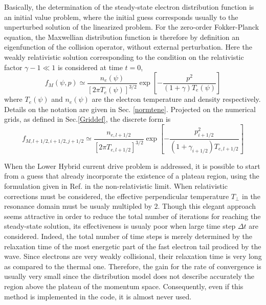

Basically, the determination of the steady-state electron distribution
function is an initial value problem, where the initial guess corresponds
usually to the unperturbed solution of the linearized problem. For the
zero-order Fokker-Planck equation, the Maxwellian distribution function is
therefore by definition an eigenfunction of the collision operator, without
external perturbation. Here the weakly relativistic solution corresponding
to the condition on the relativistic factor $\gamma -1\ll 1$ is considered
at time $t=0$,
\begin{equation}
f_{M}\left( \psi ,p\right) \simeq \frac{n_{e}\left( \psi \right) }{\left[ 2%
\pi T_{e}\left( \psi \right) \right] ^{3/2}}\exp \left[ -\frac{p^{2}}{\left(
1+\gamma \right) T_{e}\left( \psi \right) }\right]
\end{equation}
where $T_{e}\left( \psi \right) $ and $n_{e}\left( \psi \right) $ are the
electron temperature and density respectively. Details on the notation are
given in Sec. \ref{normtene}. Projected on the numerical grids, as defined
in Sec.\ref{Griddef}, the discrete form is
\begin{equation}
f_{M,l+1/2,i+1/2,j+1/2}\simeq \frac{n_{e,l+1/2}}{\left[ 2\pi %
T_{e,l+1/2}\right] ^{3/2}}\exp \left[ -\frac{p_{i+1/2}^{2}}{\left( 1+\gamma
_{i+1/2}\right) T_{e,l+1/2}}\right]
\end{equation}

When the Lower Hybrid current drive problem is addressed, it is possible to
start from a guess that already incorporate the existence of a plateau
region, using the formulation given in Ref. \cite{fuc85} in the
non-relativistic limit. When relativistic corrections must be considered,
the effective perpendicular temperature $T_{\bot }$ in the resonance domain
must be usualy  multipled by $2$. Though this elegant approach seems
attractive in order to reduce the total number of iterations for reaching
the steady-state solution, its effectiveness is usualy poor when large time
step $\Delta t$ are considered. Indeed, the total number of time steps is
merely determined by the relaxation time of the most energetic part of the
fast electron tail prodiced by the wave. Since electrons are very weakly
collisional, their relaxation time is very long as compared to the thermal
one. Therefore, the gain for the rate of convergence is usually very small
since the distribution model does not describe accurately the region above
the plateau of the momentum space. Consequently, even if this method is
implemented in the code, it is almost never used.
